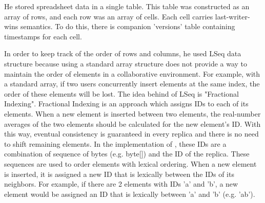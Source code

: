 \documentclass{article}
\begin{document}
He stored spreadsheet data in a single table. This table was constructed as an array of rows, and each row was an array of cells.
Each cell carries last-writer-wins semantics. To do this, there is companion 'versions' table containing timestamps for each cell.

In order to keep track of the order of rows and columns, 
he used LSeq data structure because using a standard array structure does not provide a way to maintain the order of elements in a collaborative environment.
For example, with a standard array, if two users concurrently insert elements at the same index, the order of these elements will be lost. 
The idea behind of LSeq is "Fractional Indexing". Fractional Indexing is an approach which assigns IDs to each of its elements.
When a new element is inserted between two elements, the real-number averages of the two elements should be calculated for the new element's ID. 
With this way, eventual consistency is guaranteed in every replica and there is no need to shift remaining elements.
In the implementation of \textcite{sypytkowski2023crdttables}, these IDs are a combination of sequence of bytes (e.g. byte[]) and the ID of the replica. 
These sequences are used to order elements with lexical ordering.
When a new element is inserted, it is assigned a new ID that is lexically between the IDs of its neighbors. 
For example, if there are 2 elements with IDs 'a' and 'b', a new element would be assigned an ID that is lexically between 'a' and 'b' (e.g. 'ab').
\end{document}
